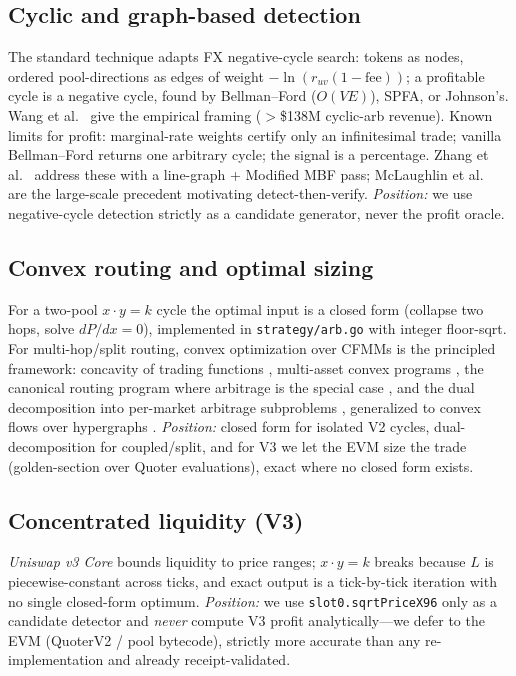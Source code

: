 \documentclass[11pt]{article}
\newcommand{\code}[1]{\texttt{#1}}
\begin{document}
\subsection{Cyclic and graph-based detection}
The standard technique adapts FX negative-cycle search: tokens as nodes, ordered
pool-directions as edges of weight $-\ln(r_{uv}(1-\text{fee}))$; a profitable cycle
is a negative cycle, found by Bellman--Ford ($O(VE)$), SPFA, or Johnson's. Wang et
al.\ \cite{wang2021cyclic} give the empirical framing ($>$\$138M cyclic-arb
revenue). Known limits for profit: marginal-rate weights certify only an
infinitesimal trade; vanilla Bellman--Ford returns one arbitrary cycle; the signal
is a percentage. Zhang et al.\ \cite{zhang2024improved} address these with a
line-graph + Modified MBF pass; McLaughlin et al.\ \cite{mclaughlin2023arbitrage}
are the large-scale precedent motivating detect-then-verify. \emph{Position:} we use
negative-cycle detection strictly as a candidate generator, never the profit oracle.

\subsection{Convex routing and optimal sizing}
For a two-pool $x\cdot y=k$ cycle the optimal input is a closed form (collapse two
hops, solve $dP/dx=0$), implemented in \code{strategy/arb.go} with integer
floor-sqrt. For multi-hop/split routing, convex optimization over CFMMs is the
principled framework: concavity of trading functions \cite{angeris2020oracles},
multi-asset convex programs \cite{angeris2021multiasset}, the canonical routing
program where arbitrage is the special case \cite{angeris2022routing}, and the dual
decomposition into per-market arbitrage subproblems \cite{diamandis2023routing},
generalized to convex flows over hypergraphs \cite{diamandis2024convexflows}.
\emph{Position:} closed form for isolated V2 cycles, dual-decomposition for
coupled/split, and for V3 we let the EVM size the trade (golden-section over Quoter
evaluations), exact where no closed form exists.

\subsection{Concentrated liquidity (V3)}
\emph{Uniswap v3 Core} \cite{adams2021uniswapv3} bounds liquidity to price ranges;
$x\cdot y=k$ breaks because $L$ is piecewise-constant across ticks, and exact output
is a tick-by-tick iteration with no single closed-form optimum. \emph{Position:} we
use \code{slot0.sqrtPriceX96} only as a candidate detector and \emph{never} compute
V3 profit analytically---we defer to the EVM (QuoterV2 / pool bytecode), strictly
more accurate than any re-implementation and already receipt-validated.
\end{document}
